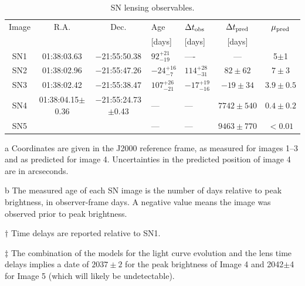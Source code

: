 \documentclass[12pt]{article}
\begin{document}
\begin{table}[tb]
    \caption{\label{tab:time_delays} SN lensing observables.} 
    \centering
\begin{threeparttable}
    \begin{tabular}{cccllcc}
    Image     & R.A.\tnote{a} & Dec.\tnote{a} & 
    Age\tnote{b} &  $\Delta t_{\rm obs}$\tnote{c} 
    & $\Delta t_{\rm pred}$\tnote{c} 
    & $\mu_{\rm pred}$ \\
    & & & [days] & [days] & [days] &  \\
\midrule
SN1 & 01:38:03.63     & $-$21:55:50.38        & $92^{+21}_{-19}$  & ---- & --- & 5$\pm$1 \\[4pt]
SN2 & 01:38:02.96     & $-$21:55:47.26        & $-24^{+16}_{-7}$  & $114^{+28}_{-31}$ & $82\pm62$  & $7\pm3$ \\[4pt]
SN3 & 01:38:02.42     & $-$21:55:38.47        & $107^{+26}_{-21}$ & $-17^{+19}_{-16}$ & $-19\pm34$ & $3.9\pm0.5$  \\[4pt]
SN4 & 01:38:04.15$\pm$0.36 & $-$21:55:24.73$\pm$0.43 &  --- & --- & $7742\pm540$\tnote{d} & $0.4\pm0.2$ \\[4pt]
SN5 &                    &                    & --- & --- & $9463\pm770$\tnote{d} & $<0.01$\\
\hline 
\end{tabular}

\begin{tablenotes}    
    \item[a]{Coordinates are given in the J2000 reference frame, as measured for images 1--3 and as predicted for image 4.  Uncertainties in the predicted position of image 4 are in arcseconds.}
    \item[b]{The measured age of each SN image is the number of days relative to peak brightness, in observer-frame days. A negative value means the image was observed prior to peak brightness.  }
    \item[$\dagger$]{Time delays are reported relative to SN1.}
    \item[$\ddag$]{The combination of the models for the light curve evolution and the lens time delays implies a date of $2037\pm2$ for the peak brightness of Image 4 and 2042$\pm$4 for Image 5 (which will likely be undetectable).}
\end{tablenotes}
\end{threeparttable}
\end{table}

    
\end{document}
